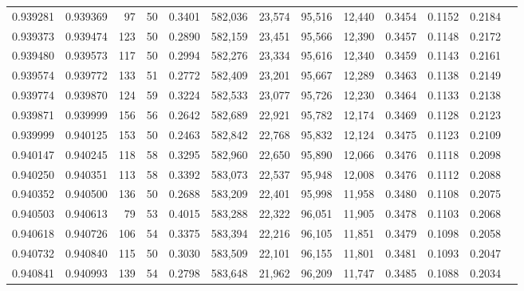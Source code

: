 \begin{tabular}{rrrrrrrrrrrrr}
0.939281 & 0.939369 &    97 &  50 &                                     0.3401 & 582,036 &  23,574 &  95,516 &  12,440 & 0.3454 & 0.1152 & 0.2184 \\
0.939373 & 0.939474 &   123 &  50 &                                     0.2890 & 582,159 &  23,451 &  95,566 &  12,390 & 0.3457 & 0.1148 & 0.2172 \\
0.939480 & 0.939573 &   117 &  50 &                                     0.2994 & 582,276 &  23,334 &  95,616 &  12,340 & 0.3459 & 0.1143 & 0.2161 \\
0.939574 & 0.939772 &   133 &  51 &                                     0.2772 & 582,409 &  23,201 &  95,667 &  12,289 & 0.3463 & 0.1138 & 0.2149 \\
0.939774 & 0.939870 &   124 &  59 &                                     0.3224 & 582,533 &  23,077 &  95,726 &  12,230 & 0.3464 & 0.1133 & 0.2138 \\
0.939871 & 0.939999 &   156 &  56 &                                     0.2642 & 582,689 &  22,921 &  95,782 &  12,174 & 0.3469 & 0.1128 & 0.2123 \\
0.939999 & 0.940125 &   153 &  50 &                                     0.2463 & 582,842 &  22,768 &  95,832 &  12,124 & 0.3475 & 0.1123 & 0.2109 \\
0.940147 & 0.940245 &   118 &  58 &                                     0.3295 & 582,960 &  22,650 &  95,890 &  12,066 & 0.3476 & 0.1118 & 0.2098 \\
0.940250 & 0.940351 &   113 &  58 &                                     0.3392 & 583,073 &  22,537 &  95,948 &  12,008 & 0.3476 & 0.1112 & 0.2088 \\
0.940352 & 0.940500 &   136 &  50 &                                     0.2688 & 583,209 &  22,401 &  95,998 &  11,958 & 0.3480 & 0.1108 & 0.2075 \\
0.940503 & 0.940613 &    79 &  53 &                                     0.4015 & 583,288 &  22,322 &  96,051 &  11,905 & 0.3478 & 0.1103 & 0.2068 \\
0.940618 & 0.940726 &   106 &  54 &                                     0.3375 & 583,394 &  22,216 &  96,105 &  11,851 & 0.3479 & 0.1098 & 0.2058 \\
0.940732 & 0.940840 &   115 &  50 &                                     0.3030 & 583,509 &  22,101 &  96,155 &  11,801 & 0.3481 & 0.1093 & 0.2047 \\
0.940841 & 0.940993 &   139 &  54 &                                     0.2798 & 583,648 &  21,962 &  96,209 &  11,747 & 0.3485 & 0.1088 & 0.2034 \\

\end{tabular}
